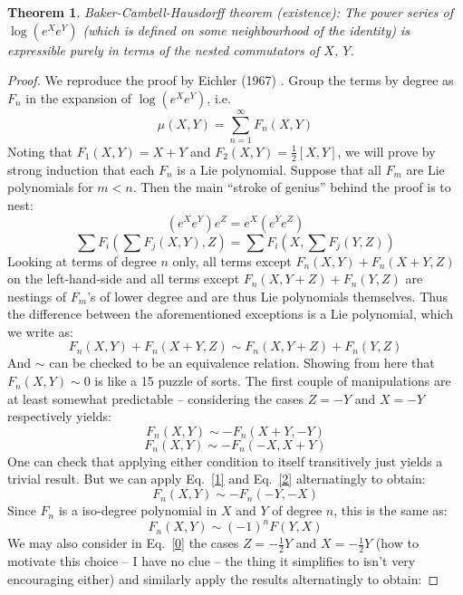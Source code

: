 \documentclass{article}
\newtheorem{theorem}{Theorem}
\begin{document}
\begin{theorem}
Baker-Cambell-Hausdorff theorem (existence): The power series of $\log(e^Xe^Y)$ (which is defined on some neighbourhood of the identity) is expressible purely in terms of the nested commutators of $X$, $Y$.
\end{theorem}
\begin{proof}
We reproduce the proof by Eichler (1967) \cite{eichler}. Group the terms by degree as $F_n$ in the expansion of $\log(e^Xe^Y)$, i.e.
$$\mu(X,Y)=\sum_{n=1}^\infty F_n(X,Y)$$
Noting that $F_1(X,Y)=X+Y$ and $F_2(X,Y)=\frac12[X,Y]$, we will prove by strong induction that each $F_n$ is a Lie polynomial. Suppose that all $F_m$ are Lie polynomials for $m<n$. Then the main ``stroke of genius'' behind the proof is to nest:
$$({e^X}{e^Y}){e^Z} = {e^X}({e^Y}{e^Z})$$
$$\sum {{F_i}\left( {\sum {{F_j}(X,Y)} ,Z} \right)}  = \sum {{F_i}\left( {X,\sum {{F_j}(Y,Z)} } \right)}$$
Looking at terms of degree $n$ only, all terms except $F_n(X,Y)+F_n(X+Y,Z)$ on the left-hand-side and all terms except $F_n(X,Y+Z)+F_n(Y,Z)$ are nestings of $F_m$'s of lower degree and are thus Lie polynomials themselves. Thus the difference between the aforementioned exceptions is a Lie polynomial, which we write as:
\begin{equation}\label{0}
    F_n(X,Y)+F_n(X+Y,Z)\sim F_n(X,Y+Z)+F_n(Y,Z)
\end{equation}
And $\sim$ can be checked to be an equivalence relation. Showing from here that $F_n(X,Y)\sim 0$ is like a 15 puzzle of sorts. The first couple of manipulations are at least somewhat predictable -- considering the cases $Z=-Y$ and $X=-Y$ respectively yields:
\begin{equation}\label{1}
    F_n(X,Y)\sim-F_n(X+Y,-Y)
\end{equation}
\begin{equation}\label{2}
    F_n(X,Y)\sim-F_n(-X,X+Y)
\end{equation}
One can check that applying either condition to itself transitively just yields a trivial result. But we can apply Eq.~\eqref{1} and Eq.~\eqref{2} alternatingly to obtain:
$$F_n(X,Y)\sim-F_n(-Y,-X)$$
Since $F_n$ is a iso-degree polynomial in $X$ and $Y$ of degree $n$, this is the same as:
\begin{equation}\label{3}
    F_n(X,Y)\sim (-1)^nF(Y,X)
\end{equation}
We may also consider in Eq.~\eqref{0} the cases $Z=-\frac12 Y$ and $X=-\frac12 Y$ (how to motivate this choice -- I have no clue -- the thing it simplifies to isn't very encouraging either) and similarly apply the results alternatingly to obtain:

\end{proof}
\end{document}
